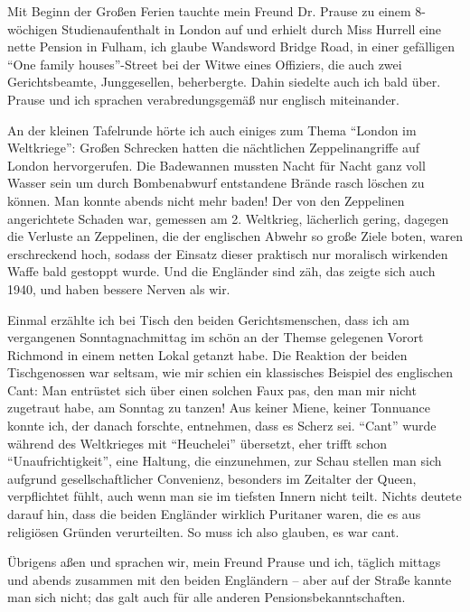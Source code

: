 Mit Beginn der Großen Ferien tauchte mein Freund Dr. Prause zu einem 8-wöchigen Studienaufenthalt in London auf und erhielt durch Miss Hurrell eine nette Pension in Fulham, ich glaube Wandsword Bridge Road, in einer gefälligen \enquote{One family houses}-Street bei der Witwe eines Offiziers, die auch zwei Gerichtsbeamte, Junggesellen, beherbergte. Dahin siedelte auch ich bald über. Prause und ich sprachen verabredungsgemäß nur englisch miteinander.

An der kleinen Tafelrunde hörte ich auch einiges zum Thema \enquote{London im Weltkriege}: Großen Schrecken hatten die nächtlichen Zeppelinangriffe auf London hervorgerufen. Die Badewannen mussten Nacht für Nacht ganz voll Wasser sein um durch Bombenabwurf entstandene Brände rasch löschen zu können. Man konnte abends nicht mehr baden! Der von den Zeppelinen angerichtete Schaden war, gemessen am 2. Weltkrieg, lächerlich gering, dagegen die Verluste an Zeppelinen, die der englischen Abwehr so große Ziele boten, waren erschreckend hoch, sodass der Einsatz dieser praktisch nur moralisch wirkenden Waffe bald gestoppt wurde. Und die Engländer sind zäh, das zeigte sich auch 1940, und haben bessere Nerven als wir.

Einmal erzählte ich bei Tisch den beiden Gerichtsmenschen, dass ich am vergangenen Sonntagnachmittag im schön an der Themse gelegenen Vorort Richmond in einem netten Lokal getanzt habe. Die Reaktion der beiden Tischgenossen war seltsam, wie mir schien ein klassisches Beispiel des englischen Cant: Man entrüstet sich über einen solchen Faux pas, den man mir nicht zugetraut habe, am Sonntag zu tanzen! Aus keiner Miene, keiner Tonnuance konnte ich, der danach forschte, entnehmen, dass es Scherz sei. \enquote{Cant} wurde während des Weltkrieges mit \enquote{Heuchelei} übersetzt, eher trifft schon \enquote{Unaufrichtigkeit}, eine Haltung, die einzunehmen, zur Schau stellen man sich aufgrund gesellschaftlicher Convenienz, besonders im Zeitalter der Queen, verpflichtet fühlt, auch wenn man sie im tiefsten Innern nicht teilt. Nichts deutete darauf hin, dass die beiden Engländer wirklich Puritaner waren, die es aus religiösen Gründen verurteilten. So muss ich also glauben, es war cant.

Übrigens aßen und sprachen wir, mein Freund Prause und ich, täglich mittags und abends zusammen mit den beiden Engländern -- aber auf der Straße kannte man sich nicht; das galt auch für alle anderen Pensionsbekanntschaften.


